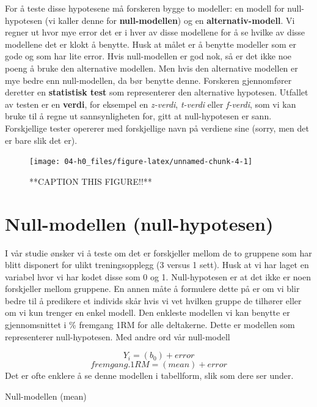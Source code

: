 \documentclass[
]{book}
\begin{document}
For å teste disse hypotesene må forskeren bygge to modeller: en modell for null-hypotesen (vi kaller denne for \textbf{null-modellen}) og en \textbf{alternativ-modell}. Vi regner ut hvor mye error det er i hver av disse modellene for å se hvilke av disse modellene det er klokt å benytte. Husk at målet er å benytte modeller som er gode og som har lite error. Hvis null-modellen er god nok, så er det ikke noe poeng å bruke den alternative modellen. Men hvis den alternative modellen er mye bedre enn null-modellen, da bør benytte denne. Forskeren gjennomfører deretter en \textbf{statistisk test} som representerer den alternative hypotesen. Utfallet av testen er en \textbf{verdi}, for eksempel en \emph{z-verdi}, \emph{t-verdi} eller \emph{f-verdi}, som vi kan bruke til å regne ut sannsynligheten for, gitt at null-hypotesen er sann. Forskjellige tester opererer med forskjellige navn på verdiene sine (sorry, men det er bare slik det er).

\begin{figure}

{\centering \texttt{[image: 04-h0\_files/figure-latex/unnamed-chunk-4-1]} 

}

\caption{**CAPTION THIS FIGURE!!**}\label{fig:unnamed-chunk-4}
\end{figure}

\hypertarget{null-modellen-null-hypotesen}{%
\section{Null-modellen (null-hypotesen)}\label{null-modellen-null-hypotesen}}

I vår studie ønsker vi å teste om det er forskjeller mellom de to gruppene som har blitt disponert for ulikt treningsopplegg (3 versus 1 sett). Husk at vi har laget en variabel hvor vi har kodet disse som 0 og 1. Null-hypotesen er at det ikke er noen forskjeller mellom gruppene. En annen måte å formulere dette på er om vi blir bedre til å predikere et individs skår hvis vi vet hvilken gruppe de tilhører eller om vi kun trenger en enkel modell. Den enkleste modellen vi kan benytte er gjennomsnittet i \% fremgang 1RM for alle deltakerne. Dette er modellen som representerer null-hypotesen. Med andre ord vår null-modell

\[
Y_i = (b_0) + error
\]
\[
fremgang.1RM = (mean) + error
\]
Det er ofte enklere å se denne modellen i tabellform, slik som dere ser under.

\label{tab:unnamed-chunk-6}Null-modellen (mean)
\end{document}
